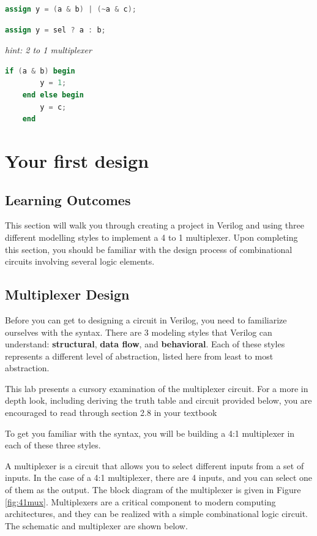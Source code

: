 \documentclass[12pt]{journal}
\begin{document}
\begin{lstlisting}[language=Verilog]
    assign y = (a & b) | (~a & c);
\end{lstlisting}
\vspace{3\textheight}
\begin{lstlisting}[language=Verilog]
    assign y = sel ? a : b;
\end{lstlisting}
\textit{\small{hint: 2 to 1 multiplexer}}
\vspace{16em}
\begin{lstlisting}[language=Verilog]  
    if (a & b) begin
        y = 1;
    end else begin
        y = c;
    end
\end{lstlisting}
\newpage
\section{Your first design}
\subsection{Learning Outcomes}
This section will walk you through creating a project in Verilog and using three different modelling styles to implement a 4 to 1 multiplexer. Upon completing this section, you should be familiar with the design process of combinational circuits involving several logic elements.


\subsection{Multiplexer Design}

\begin{paracol}{2}
\switchcolumn[0]    
Before you can get to designing a circuit in Verilog, you need to familiarize ourselves with the syntax. There are 3 modeling styles that Verilog can understand: \textbf{structural}, \textbf{data flow}, and \textbf{behavioral}. Each of these styles represents a different level of abstraction, listed here from least to most abstraction. 
\switchcolumn[1]
\begin{extra}[frametitle={Textbook Reading: Multiplexers}]
    This lab presents a cursory examination of the multiplexer circuit. For a more in depth look, including deriving the truth table and circuit provided below, you are encouraged to read through section 2.8 in your textbook
\end{extra}
\switchcolumn[0]
To get you familiar with the syntax, you will be building a 4:1 multiplexer in each of these three styles.
\end{paracol}
A multiplexer is a circuit that allows you to select different inputs from a set of inputs. In the case of a 4:1 multiplexer, there are 4 inputs, and you can select one of them as the output. 
The block diagram of the multiplexer is given in Figure \ref{fig:41mux}. Multiplexers are a critical component to modern computing architectures, and they can be realized with a simple combinational logic circuit. The schematic and multiplexer are shown below.
\clearpage
\end{document}

